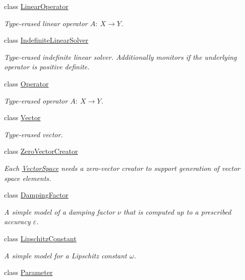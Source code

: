 \begin{DoxyCompactItemize}
class \hyperlink{classSpacy_1_1LinearOperator}{\-Linear\-Operator}
\begin{DoxyCompactList}\small\item\em \-Type-\/erased linear operator $A:\ X \to Y $. \end{DoxyCompactList}\item 
class \hyperlink{classSpacy_1_1IndefiniteLinearSolver}{\-Indefinite\-Linear\-Solver}
\begin{DoxyCompactList}\small\item\em \-Type-\/erased indefinite linear solver. \-Additionally monitors if the underlying operator is positive definite. \end{DoxyCompactList}\item 
class \hyperlink{classSpacy_1_1Operator}{\-Operator}
\begin{DoxyCompactList}\small\item\em \-Type-\/erased operator $A:\ X \to Y $. \end{DoxyCompactList}\item 
class \hyperlink{classSpacy_1_1Vector}{\-Vector}
\begin{DoxyCompactList}\small\item\em \-Type-\/erased vector. \end{DoxyCompactList}\item 
class \hyperlink{classSpacy_1_1ZeroVectorCreator}{\-Zero\-Vector\-Creator}
\begin{DoxyCompactList}\small\item\em \-Each \hyperlink{classSpacy_1_1VectorSpace}{\-Vector\-Space} needs a zero-\/vector creator to support generation of vector space elements. \end{DoxyCompactList}\item 
class \hyperlink{classSpacy_1_1DampingFactor}{\-Damping\-Factor}
\begin{DoxyCompactList}\small\item\em \-A simple model of a damping factor $\nu$ that is computed up to a prescribed accuracy $\varepsilon$. \end{DoxyCompactList}\item 
class \hyperlink{classSpacy_1_1LipschitzConstant}{\-Lipschitz\-Constant}
\begin{DoxyCompactList}\small\item\em \-A simple model for a \-Lipschitz constant $\omega$. \end{DoxyCompactList}\item 
class \hyperlink{classSpacy_1_1Parameter}{\-Parameter}

\end{DoxyCompactItemize}

